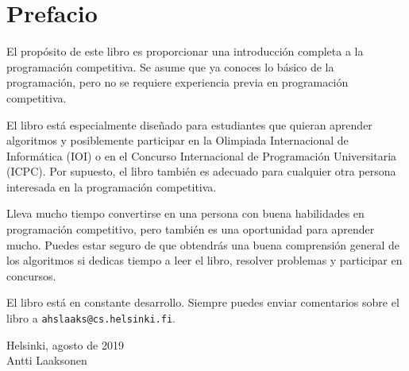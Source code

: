\chapter*{Prefacio}

El propósito de este libro es proporcionar
una introducción completa a la programación competitiva.
Se asume que ya
conoces lo básico de la programación, pero no se requiere
experiencia previa en programación competitiva.

El libro está especialmente diseñado para
estudiantes que quieran aprender algoritmos y
posiblemente participar en
la Olimpiada Internacional de Informática (IOI) o
en el Concurso Internacional de Programación Universitaria (ICPC).
Por supuesto, el libro también es adecuado para
cualquier otra persona interesada en la programación competitiva.

Lleva mucho tiempo convertirse en una persona con buena habilidades
en programación competitivo, pero también es una oportunidad para aprender mucho.
Puedes estar seguro de que obtendrás
una buena comprensión general de los algoritmos
si dedicas tiempo a leer el libro,
resolver problemas y participar en concursos.

El libro está en constante desarrollo.
Siempre puedes enviar comentarios sobre el libro a
\texttt{ahslaaks@cs.helsinki.fi}.

\begin{flushright}
Helsinki, agosto de 2019 \\
Antti Laaksonen
\end{flushright}
